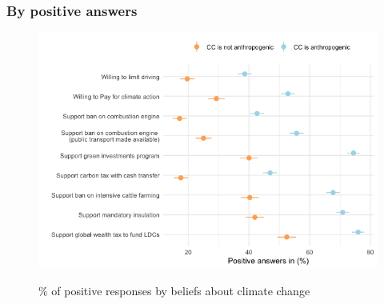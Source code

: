 \begin{framefont}{\small}


\subsubsection{By positive answers}




\begin{frame}{}%
\begin{figure}[h!]
\caption{\% of positive responses by beliefs about climate change} %
\includegraphics[width=.7\paperwidth]{../figures/FR/positive_all_by_CC_anthropogenic_FR.png} \\
\end{figure}
\end{frame}


\end{framefont}
